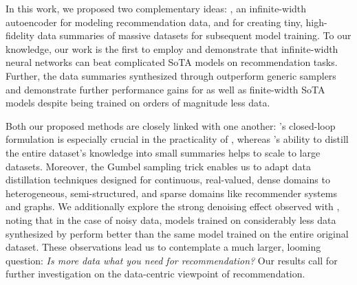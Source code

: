\documentclass{article}
\begin{document}
In this work, we proposed two complementary ideas: \model, an infinite-width autoencoder for modeling recommendation data, and \sampler for creating tiny, high-fidelity data summaries of massive datasets for subsequent model training. To our knowledge, our work is the first to employ and demonstrate that infinite-width neural networks can beat complicated SoTA models on recommendation tasks. Further, the data summaries synthesized through \sampler outperform generic samplers and demonstrate 
further
performance gains for \model as well as finite-width SoTA models despite being trained on orders of magnitude 
less
data. 

Both our proposed methods are closely linked with one another: \model's closed-loop formulation is especially crucial in the practicality of \sampler, whereas \sampler's ability to distill the entire dataset's knowledge into small summaries helps \model to scale to large datasets. Moreover, the Gumbel sampling trick enables us to adapt data distillation techniques designed for continuous, real-valued, dense domains to heterogeneous, semi-structured, and sparse domains like recommender systems and graphs. We additionally explore the strong denoising effect observed with \sampler, noting that in the case of noisy data, models trained on considerably
less
data synthesized by \sampler perform better than the same model trained on the entire original dataset. 
These observations lead us to contemplate a much larger, 
looming
question: \emph{Is more data what you need for recommendation?} Our results call for further investigation on the data-centric viewpoint of recommendation.
\end{document}
